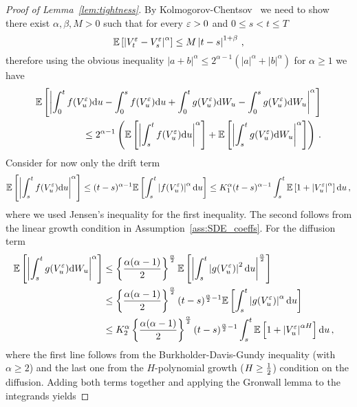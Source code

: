 \begin{proof}[Proof of Lemma~\ref{lem:tightness}]
By Kolmogorov-Chentsov~\cite[Theorem 21.42]{Klenke2014ProbabilityTheory} we need to show there exist $\alpha, \beta, M > 0$ such that for every $\varepsilon >0$ and $0\leq s < t \leq T$
\[
\mathbb{E}\left[\left\vert V_t^\varepsilon - V_s^\varepsilon\right\vert^\alpha\right] \leq M \left\vert t - s\right\vert^{1+\beta}\,,
\]
therefore using the obvious inequality 
$|a+b|^{\alpha} \leq 2^{\alpha-1}\left(|a|^{\alpha}+|b|^{\alpha}\right)$ for $\alpha\geq1$ we have
\begin{align*}
\mathbb{E}\left[ \left\vert \int_0^t f(V_u^\varepsilon)\mathrm{d} u - \int_0^s f(V_u^\varepsilon)\mathrm{d} u + \int_0^t g(V_u^\varepsilon)\mathrm{d} W_u - \int_0^s g(V_u^\varepsilon)\mathrm{d} W_u \right \vert^\alpha \right ] \\ \leq 2^{\alpha-1} \left( \mathbb{E}\left[ \left\vert  \int_s^t f(V_u^\varepsilon) \mathrm{d} u \right\vert^\alpha \right ] + \mathbb{E}\left[ \left\vert  \int_s^t g(V_u ^\varepsilon) \mathrm{d} W_u \right\vert^\alpha \right] \right)\,.
\end{align*}
Consider for now only the drift term
$$
\mathbb{E}\left[ \left\vert  \int_s^t f(V_u^\varepsilon) \mathrm{d} u \right\vert^\alpha \right ]
\leq (t-s)^{\alpha-1}\mathbb{E}\left[ \int_s^t \left\vert f(V_u^\varepsilon)\right\vert^\alpha \mathrm{d} u  \right ]
\leq K_1^\alpha(t-s)^{\alpha-1}\int_s^t \mathbb{E}\left[ 1 + \left\vert V_u^\varepsilon\right\vert^\alpha \right]\mathrm{d} u\,,
$$
where we used Jensen's inequality for the first inequality. 
The second follows from the linear growth condition in Assumption~\ref{ass:SDE_coeffs}. For the diffusion term
\begin{align*}
\EE\left[ \left\vert  \int_s^t g(V_u ^\eps) \D W_u \right\vert^\alpha \right] 
&\leq \left\{\frac{\alpha(\alpha-1)}{2}\right\}^{\frac{\alpha}{2}} \EE\left[ \left\vert  \int_s^t \left\vert g(V_u ^\eps)\right\vert^{2} \D u \right\vert^{\frac{\alpha}{2}} \right]\\
&\leq \left\{\frac{\alpha(\alpha-1)}{2}\right\}^{\frac{\alpha}{2}} (t-s)^{\frac{\alpha}{2}-1} \EE\left[\int_s^t \left\vert g(V_u ^\eps)\right\vert^{\alpha} \D u  \right] & %
\\
&\leq K_2^\alpha \left\{\frac{\alpha(\alpha-1)}{2}\right\}^{\frac{\alpha}{2}} (t-s)^{\frac{\alpha}{2}-1} \int_s^t \EE\left[1 +  \left\vert V_u^\eps\right\vert^{\alpha H} \right] \D u\,,
\end{align*}
where the first line follows from the Burkholder-Davis-Gundy inequality (with $\alpha\geq 2$) and the last one from the 
$H$-polynomial growth ($H\geq \frac{1}{2}$) condition on the diffusion. 
Adding both terms together and applying the Gronwall lemma to the integrands yields

\end{proof}
